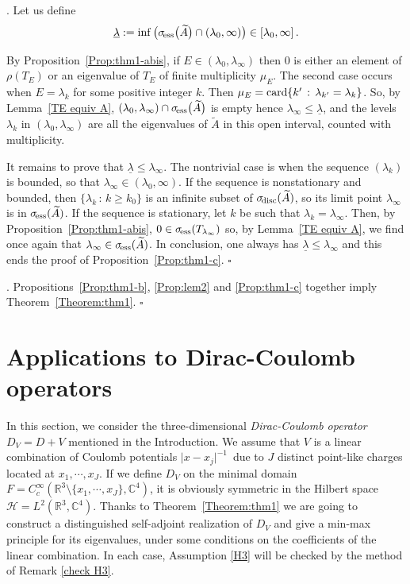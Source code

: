\documentclass[12pt,reqno]{amsart}
\newcommand{\R}{{\mathbb R}}
\newcommand{\C}{{\mathbb C}}
\renewcommand{\(}{\left(}
\renewcommand{\)}{\right)}
\newcommand{\finprf}{\null\hfill$\square$\vskip 0.3cm}
\begin{document}
. Let us define  \[\underline{\lambda}:=\inf \big(\sigma_{\!\rm ess}\big(\widetilde A\big)\cap (\lambda_0,\infty)\big)\in [\lambda_0,\infty]\,.\]

By Proposition~\ref{Prop:thm1-abis}, if $E\in (\lambda_0,\lambda_\infty)$ then $0$ is either an element of $\rho(T_E)$ or an eigenvalue of $T_E$ of finite multiplicity $\mu_E$. The second case occurs when $E=\lambda_k$ for some positive integer $k$. Then $\mu_E={\rm card}\{k'\,:\, \lambda_{k'}=\lambda_{k}\}$. So, by Lemma~\ref{TE equiv A}, $(\lambda_0,\lambda_\infty)\cap\sigma_{\!\rm ess}\big(\widetilde A\big)$ is empty hence $\lambda_\infty\leq \underline{\lambda}$, and the levels $\lambda_k$ in $(\lambda_0,\lambda_\infty)$ are all the eigenvalues of $\widetilde A$ in this open interval, counted with multiplicity.

It remains to prove that $\underline{\lambda}\leq \lambda_\infty$. The nontrivial case is when the sequence $(\lambda_k)$ is bounded, so that $\lambda_\infty\in (\lambda_0,\infty)$. If the sequence is nonstationary and bounded, then $\{\lambda_k\,:\,k\geq k_0\}$ is an infinite subset of $\sigma_{\!\rm disc}(\widetilde A)$, so its limit point $\lambda_\infty$ is in $\sigma_{\!\rm ess}(\widetilde A)$. If the sequence is stationary, let $k$ be such that $\lambda_k=\lambda_\infty$. Then, by Proposition~\ref{Prop:thm1-abis}, $0\in\sigma_{\!\rm ess}(T_{\lambda_\infty})$ so, by Lemma~\ref{TE equiv A}, we find once again that $\lambda_\infty\in \sigma_{\!\rm ess}(\widetilde A) $. In conclusion, one always has $\underline{\lambda}\leq \lambda_\infty$ and this ends the proof of Proposition~\ref{Prop:thm1-c}. \finprf

.   Propositions~\ref{Prop:thm1-b}, \ref{Prop:lem2} and \ref{Prop:thm1-c} together imply Theorem~\ref{Theorem:thm1}. 
\finprf


\section{Applications to Dirac-Coulomb operators} \label{Section:DC}

\noindent In this section, we consider the three-dimensional {\it Dirac-Coulomb operator} $D_V=D+V$ mentioned in the Introduction. We assume that $V$ is a linear combination of Coulomb potentials $\vert x-x_j\vert^{-1}\,$ due to $J$ distinct point-like charges located at $x_1,\cdots,x_J$. If we define $D_V$ on the minimal domain $F=C^\infty_c(\R^3\setminus\{x_1,\cdots,x_J\}, \C^4)$, it is obviously symmetric in the Hilbert space $\mathcal H=L^2(\R^3,\C^4)$.
Thanks to Theorem~\ref{Theorem:thm1} we are going to construct a distinguished self-adjoint realization of $D_V$ and give a min-max principle for its eigenvalues, under some conditions on the coefficients of the linear combination. In each case, Assumption \eqref{H3} will be checked by the method of Remark \ref{check H3}.
\end{document}
